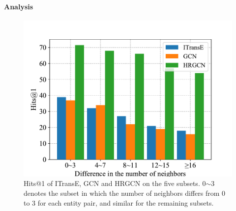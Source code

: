 	
	
	
	\paragraph{Analysis}
	\begin{figure}
		\begin{center}
			\includegraphics[width=1\linewidth]{graph4.pdf}
			\caption{Hits@1 of ITransE, GCN and HRGCN on the five subsets. 0$\sim$3 denotes the subset in which the number of neighbors differs from 0 to 3 for each entity pair, and similar for the remaining subsets.}
			\label{subset}
		\end{center}
	\end{figure}
